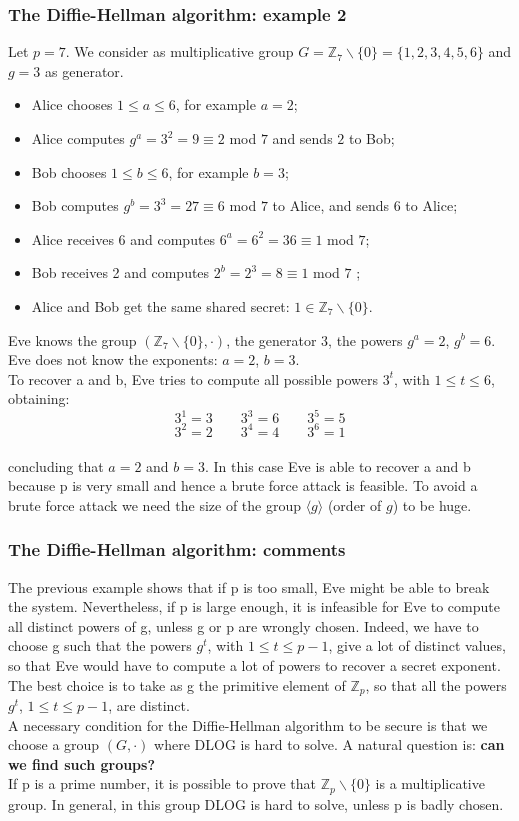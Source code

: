 \documentclass[a4paper, 10pt, titlepage]{article}
\begin{document}
\subsubsection*{The Diffie-Hellman algorithm: example 2}
Let $p = 7$. We consider as multiplicative group $G = \mathbb{Z}_7 \backslash \{0\} = \{1, 2, 3, 4, 5, 6\}$ and $g = 3$ as generator.
\begin{itemize}
\item Alice chooses $1 \leq a \leq 6$, for example $a = 2$;
\item Alice computes $g^a = 3^2 = 9 \equiv 2$ mod $7$ and sends $2$ to Bob;
\item Bob chooses $1 \leq b \leq 6$, for example $b = 3$;
\item Bob computes $g^b = 3^3 = 27 \equiv 6$ mod $7$ to Alice, and sends $6$ to Alice;
\item Alice receives 6 and computes $6^a = 6^2 = 36 \equiv 1$ mod $7$;
\item Bob receives 2 and computes $2^b = 2^3 = 8 \equiv 1$ mod $7$ ;
\item Alice and Bob get the same shared secret: $1 \in \mathbb{Z}_7 \backslash \{0\}$.
\end{itemize}
Eve knows the group $(\mathbb{Z}_7 \backslash \{0\}, \cdot)$, the generator 3, the powers $g^a = 2$, $g^b = 6$.\\
Eve does not know the exponents: $a = 2$, $b = 3$.\\
To recover a and b, Eve tries to compute all possible powers $3^t$, with $1 \leq t \leq 6$, obtaining:
$$3^1 = 3 \quad \quad 3^3 = 6 \quad \quad 3^5 = 5$$
$$3^2 = 2 \quad \quad 3^4 = 4 \quad \quad 3^6 = 1$$\\
concluding that $a = 2$ and $b = 3$.
In this case Eve is able to recover a and b because p is very small and hence a brute force attack is feasible. To avoid a brute force attack we need the size of the group $\langle g \rangle$ (order of $g$) to be huge.

\subsubsection*{The Diffie-Hellman algorithm: comments}
The previous example shows that if p is too small, Eve might be able to break the system. Nevertheless, if p is large enough, it is infeasible for Eve to compute all distinct powers of g, unless g or p are wrongly chosen. Indeed, we have to choose g such that the powers $g^t$, with $1 \leq t \leq p - 1$, give a lot of distinct values, so that Eve would have to compute a lot of powers to recover a secret exponent. The best choice is to take as g the primitive element of $\mathbb{Z}_p$, so that all the powers $g^t$, $1 \leq t \leq p - 1$, are distinct.\\
A necessary condition for the Diffie-Hellman algorithm to be secure is that we choose a group $(G, \cdot)$ where DLOG is hard to solve.
A natural question is: \textbf{can we find such groups?}\\
If p is a prime number, it is possible to prove that $\mathbb{Z}_p \backslash \{0\}$ is a multiplicative group. In general, in this group DLOG is hard to solve, unless p is badly chosen.
\end{document}
